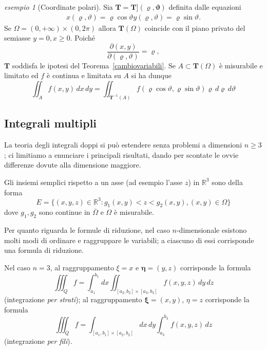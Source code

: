 \documentclass[a4paper]{book}
\numberwithin{equation}{section}
\renewcommand{\theta}{\vartheta}
\renewcommand{\rho}{\varrho}
\theoremstyle{plain}
\theoremstyle{definition}
\theoremstyle{remark}
\renewcommand{\vec}{\boldsymbol}
\theoremstyle{example}
\newtheorem{exmp}{esempio}[section]
\begin{document}
\begin{exmp}[Coordinate polari] Sia $\vec{T} = \vec{T](\rho, \theta)}$ definita dalle equazioni
	\begin{gather*}
		x(\rho, \theta) = \rho\cos\theta
		y(\rho, \theta) = \rho\sin\theta.
	\end{gather*}
	Se $\Omega = (0, +\infty) \times (0, 2\pi)$ allora $\vec{T}(\Omega)$ coincide con il piano privato del semiasse $y = 0, x \ge 0$. Poiché
	\begin{equation*}
		\frac{\partial (x, y)}{\partial (\rho, \theta)} = \rho,
	\end{equation*}
	$\vec{T}$ soddisfa le ipotesi del Teorema~\ref{cambiovariabili}. Se $A \subset \vec{T}(\Omega)$ è misurabile e limitato ed $f$ è continua e limitata su $A$ si ha dunque
	\begin{equation}
		\iint_A f(x, y) \, dx \, dy = \iint_{\vec{T}^{-1}(A)}f(\rho\cos\theta, \rho\sin\theta) \rho \, d\rho\,d\theta
	\end{equation}
\end{exmp}

\subsection{Integrali multipli}
La teoria degli integrali doppi si può estendere senza problemi a dimensioni $n \ge 3$; ci limitiamo a enunciare i principali risultati, dando per scontate le ovvie differenze dovute alla dimensione maggiore.

Gli insiemi semplici rispetto a un asse (ad esempio l'asse $z$) in $\mathbb{R}^3$ sono della forma
\begin{equation*}
	E = \{ (x, y, z) \in \mathbb{R}^3 \colon g_1(x, y) < z < g_2(x, y), (x, y) \in \Omega \}
\end{equation*}
dove $g_1, g_2$ sono continue in $\overline{\Omega}$ e $\Omega$ è misurabile.

Per quanto riguarda le formule di riduzione, nel caso $n$-dimensionale esistono molti modi di ordinare e raggruppare le variabili; a ciascuno di essi corrisponde una formula di riduzione.

Nel caso $n = 3$, al raggruppamento $\xi = x$ e $\vec{\eta} = (y, z)$ corrisponde la formula
\begin{equation}
	\iiint_Q f = \int_{a_1}^{b_1} dx \iint_{[a_2, b_2]\times[a_3, b_3]} f(x, y, z)\,dy\,dz
\end{equation}
(integrazione \emph{per strati}); al raggruppamento $\vec{\xi} = (x, y)$, $\eta = z$ corrisponde la formula
\begin{equation}
	\label{eqn:fili}
	\iiint_Q f = \int_{[a_1, b_1]\times[a_2, b_2]} dx \, dy \int_{a_3}^{b_3}f(x, y, z)\,dz
\end{equation}
(integrazione \emph{per fili}).
\end{document}
